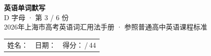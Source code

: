 \documentclass[10pt,a4paper]{article}
\begin{document}
\pagestyle{plain}

\begin{center}
{\LARGE\bfseries 英语单词默写}\\[0.22em]
{\large D 字母 · 第 3 / 6 份}\\[0.18em]
{\small 2026年上海市高考英语词汇用法手册 · 参照普通高中英语课程标准}
\end{center}

\vspace{0.25em}
\noindent\begin{tabular}{@{}p{}@{}p{}@{}p{}@{}}
姓名：\underline{\hspace{2.0cm}} & 日期：\underline{\hspace{2.0cm}} & 得分：\underline{\hspace{1.3cm}}\,/\,44 \\
\end{tabular}

\vspace{0.3em}

\vspace{0.08em}
\end{document}
